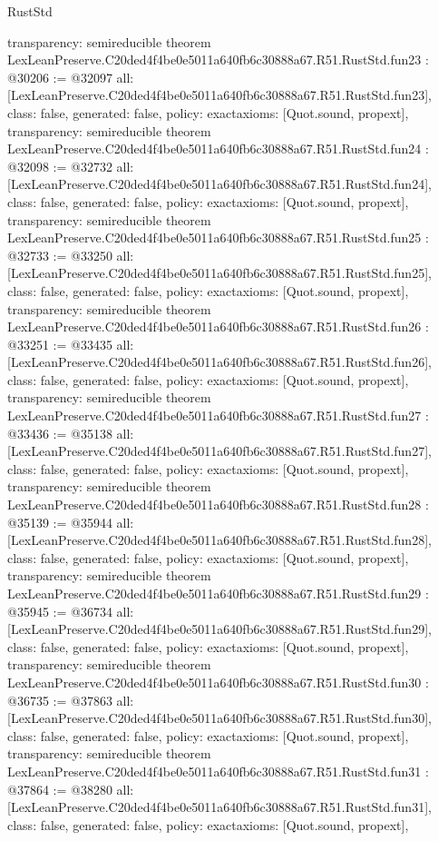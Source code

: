 \begin{lexlean}{RustStd}
\begin{coremodule}
{  transparency: semireducible
}
theorem LexLeanPreserve.C20ded4f4be0e5011a640fb6c30888a67.R51.RustStd.fun23 : @30206 := @32097 {
  all: [LexLeanPreserve.C20ded4f4be0e5011a640fb6c30888a67.R51.RustStd.fun23],
  class: false,
  generated: false,
  policy: exact{axioms: [Quot.sound, propext]},
  transparency: semireducible
}
theorem LexLeanPreserve.C20ded4f4be0e5011a640fb6c30888a67.R51.RustStd.fun24 : @32098 := @32732 {
  all: [LexLeanPreserve.C20ded4f4be0e5011a640fb6c30888a67.R51.RustStd.fun24],
  class: false,
  generated: false,
  policy: exact{axioms: [Quot.sound, propext]},
  transparency: semireducible
}
theorem LexLeanPreserve.C20ded4f4be0e5011a640fb6c30888a67.R51.RustStd.fun25 : @32733 := @33250 {
  all: [LexLeanPreserve.C20ded4f4be0e5011a640fb6c30888a67.R51.RustStd.fun25],
  class: false,
  generated: false,
  policy: exact{axioms: [Quot.sound, propext]},
  transparency: semireducible
}
theorem LexLeanPreserve.C20ded4f4be0e5011a640fb6c30888a67.R51.RustStd.fun26 : @33251 := @33435 {
  all: [LexLeanPreserve.C20ded4f4be0e5011a640fb6c30888a67.R51.RustStd.fun26],
  class: false,
  generated: false,
  policy: exact{axioms: [Quot.sound, propext]},
  transparency: semireducible
}
theorem LexLeanPreserve.C20ded4f4be0e5011a640fb6c30888a67.R51.RustStd.fun27 : @33436 := @35138 {
  all: [LexLeanPreserve.C20ded4f4be0e5011a640fb6c30888a67.R51.RustStd.fun27],
  class: false,
  generated: false,
  policy: exact{axioms: [Quot.sound, propext]},
  transparency: semireducible
}
theorem LexLeanPreserve.C20ded4f4be0e5011a640fb6c30888a67.R51.RustStd.fun28 : @35139 := @35944 {
  all: [LexLeanPreserve.C20ded4f4be0e5011a640fb6c30888a67.R51.RustStd.fun28],
  class: false,
  generated: false,
  policy: exact{axioms: [Quot.sound, propext]},
  transparency: semireducible
}
theorem LexLeanPreserve.C20ded4f4be0e5011a640fb6c30888a67.R51.RustStd.fun29 : @35945 := @36734 {
  all: [LexLeanPreserve.C20ded4f4be0e5011a640fb6c30888a67.R51.RustStd.fun29],
  class: false,
  generated: false,
  policy: exact{axioms: [Quot.sound, propext]},
  transparency: semireducible
}
theorem LexLeanPreserve.C20ded4f4be0e5011a640fb6c30888a67.R51.RustStd.fun30 : @36735 := @37863 {
  all: [LexLeanPreserve.C20ded4f4be0e5011a640fb6c30888a67.R51.RustStd.fun30],
  class: false,
  generated: false,
  policy: exact{axioms: [Quot.sound, propext]},
  transparency: semireducible
}
theorem LexLeanPreserve.C20ded4f4be0e5011a640fb6c30888a67.R51.RustStd.fun31 : @37864 := @38280 {
  all: [LexLeanPreserve.C20ded4f4be0e5011a640fb6c30888a67.R51.RustStd.fun31],
  class: false,
  generated: false,
  policy: exact{axioms: [Quot.sound, propext]},
}
\end{coremodule}
\end{lexlean}
